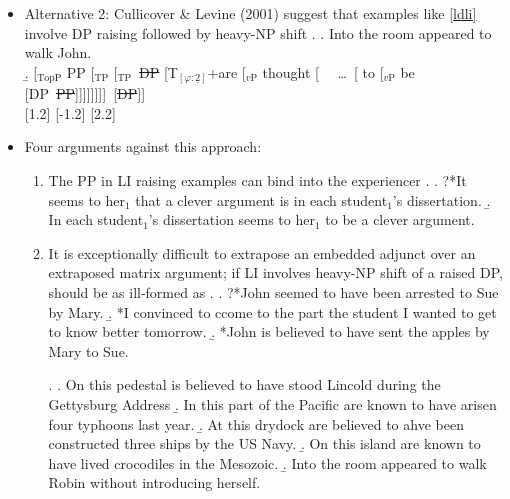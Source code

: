 \documentclass[letterpaper,10pt]{handout_nick}
\begin{document}
\begin{itemize}
\begin{enumerate}
\end{enumerate}
\item Alternative 2: Cullicover \& Levine (2001) suggest that examples like \ref{ldli} involve DP raising followed by heavy-NP shift
\ex. \a. Into the room appeared to walk John.\\
\b. [$_\text{TopP}$ \hspace*{-.3cm}PP  [$_\text{TP}$ [$_\text{TP}$\  \hspace*{-.3cm}\st{DP} [\hspace*{-.2cm}T$_{[\varphi:\underline{2}]}$+are [$_\text{$v$P}$ thought [ \ \ \ldots\ [ to [$_\text{$v$P}$ be [\hspace*{-.3cm}DP\ \hspace*{-.3cm}\st{PP}]]]]]]]]\ \hspace*{-.3cm}[\st{DP}]]\\
[1.2]
[-1.2]
[2.2]

\item Four arguments against this approach:
\begin{enumerate}
\item The PP in LI raising examples can bind into the experiencer 
\ex. \a. ?*It seems to her$_1$ that a clever argument is in each student$_1$'s dissertation.
\b. In each student$_1$'s dissertation seems to her$_1$ to be a clever argument.

\item It is exceptionally difficult to extrapose an embedded adjunct over an extraposed matrix argument; if LI involves heavy-NP shift of a raised DP, \NNext should be as ill-formed as \Next
\ex. \a. ?*John seemed to have been arrested to Sue by Mary.
\b. *I convinced to ccome to the part the student I wanted to get to know better tomorrow.
\b. *John is believed to have sent the apples by Mary to Sue.

\ex. \a. On this pedestal is believed to have stood Lincold during the Gettysburg Address
\b. In this part of the Pacific are known to have arisen four typhoons last year.
\b. At this drydock are believed to ahve been constructed three ships by the US Navy.
\b. On this island are known to have lived crocodiles in the Mesozoic.
\b. Into the room appeared to walk Robin without introducing herself. 


\end{enumerate}
\end{itemize}
\end{document}
